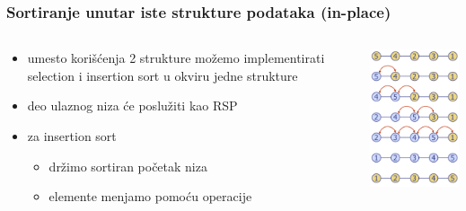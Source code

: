 \documentclass[compress,aspectratio=169]{beamer}
\begin{document}
\begin{frame}[fragile]
  \frametitle{Sortiranje unutar iste strukture podataka (in-place)}
  \begin{columns}
    \begin{column}[c]{6cm}
      \begin{itemize}
        \item umesto korišćenja 2 strukture možemo implementirati selection i insertion sort u okviru jedne strukture
        \item deo ulaznog niza će poslužiti kao RSP
        \item za insertion sort
        \begin{itemize}
          \item držimo sortiran početak niza
          \item elemente menjamo pomoću  operacije
        \end{itemize}
      \end{itemize}
    \end{column}
    \begin{column}[c]{5cm}
      \begin{center}
        \includegraphics[width=4.5cm]{asp-09-pic21.png}
      \end{center}
    \end{column}
  \end{columns}
\end{frame}
\end{document}
